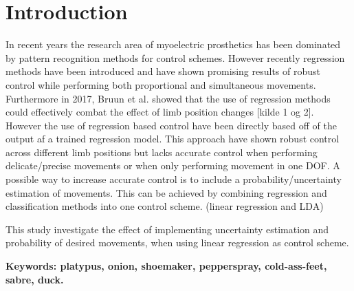 
\section{Introduction}			%


In recent years the research area of myoelectric prosthetics has been dominated by pattern recognition methods for control schemes. However recently regression methods have been introduced and have shown promising results of robust control while performing both proportional and simultaneous movements. Furthermore in 2017, Bruun et al. showed that the use of regression methods could effectively combat the effect of limb position changes [kilde 1 og 2]. However the use of regression based control have been directly based off of the output af a trained regression model. This approach have shown robust control across different limb positions but lacks accurate control when performing delicate/precise movements or when only performing movement in one DOF. A possible way to increase accurate control is to include a probability/uncertainty estimation of movements. This can be achieved by combining regression and classification methods into one control scheme. (linear regression and LDA)

This study investigate the effect of implementing uncertainty estimation and probability of desired movements, when using linear regression as control scheme. 


\textbf{Keywords: platypus, onion, shoemaker, pepperspray, cold-ass-feet, sabre, duck.}